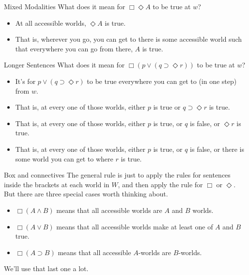 \documentclass[
  14pt,
  letterpaper,
  ignorenonframetext,
  aspectratio=169,
  handout]{beamer}
\providecommand{\tightlist}{%
  \setlength{\itemsep}{0pt}\setlength{\parskip}{0pt}}\usepackage{longtable,booktabs,array}
\begin{document}
\begin{frame}{Mixed Modalities}
\protect\hypertarget{mixed-modalities-1}{}
What does it mean for \(\Box \Diamond A\) to be true at \(w\)?

\begin{itemize}[<+->]
\tightlist
\item
  At all accessible worlds, \(\Diamond A\) is true.
\item
  That is, wherever you go, you can get to there is some accessible
  world such that everywhere you can go from there, \(A\) is true.
\end{itemize}
\end{frame}

\begin{frame}{Longer Sentences}
\protect\hypertarget{longer-sentences}{}
What does it mean for \(\Box(p \vee (q \supset \Diamond r))\) to be true
at \(w\)?

\begin{itemize}[<+->]
\tightlist
\item
  It's for \(p \vee (q \supset \Diamond r)\) to be true everywhere you
  can get to (in one step) from \(w\).
\item
  That is, at every one of those worlds, either \(p\) is true or
  \(q \supset \Diamond r\) is true.
\item
  That is, at every one of those worlds, either \(p\) is true, or \(q\)
  is false, or \(\Diamond r\) is true.
\item
  That is, at every one of those worlds, either \(p\) is true, or \(q\)
  is false, or there is some world you can get to where \(r\) is true.
\end{itemize}
\end{frame}

\begin{frame}{Box and connectives}
\protect\hypertarget{box-and-connectives}{}
The general rule is just to apply the rules for sentences inside the
brackets at each world in \(W\), and then apply the rule for \(\Box\) or
\(\Diamond\). But there are three special cases worth thinking about.

\begin{itemize}[<+->]
\tightlist
\item
  \(\Box(A \wedge B)\) means that all accessible worlds are \(A\) and
  \(B\) worlds.
\item
  \(\Box(A \vee B)\) means that all accessible worlds make at least one
  of \(A\) and \(B\) true.
\item
  \(\Box(A \supset B)\) means that all accessible \(A\)-worlds are
  \(B\)-worlds.
\end{itemize}

We'll use that last one a lot.
\end{frame}
\end{document}
